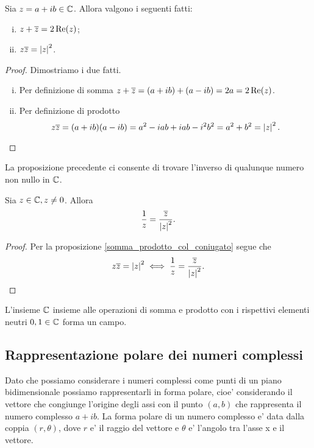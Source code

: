 \begin{proposition}\label{somma_prodotto_col_coniugato}
    Sia $z = a+ib \in \mathbb{C}$. Allora valgono i seguenti fatti:
    \begin{enumerate}[(i)]
        \item $z + \overline{z} = 2\operatorname{Re}(z)$;
        \item $z\overline{z} = \left|z\right|^2$.
    \end{enumerate}
\end{proposition}
\begin{proof}
    Dimostriamo i due fatti.
    \begin{enumerate}[(i)]
        \item Per definizione di somma $z + \overline{z} = (a + ib) + (a - ib) = 2a = 2\operatorname{Re}(z)$.
        \item Per definizione di prodotto \[
            z\overline{z} = (a + ib)(a - ib) = a^2 - iab + iab - i^2b^2 = a^2 + b^2 = \left|z\right|^2.\qedhere
        \] 
    \end{enumerate}
\end{proof}

La proposizione precedente ci consente di trovare l'inverso di qualunque numero non nullo in $\mathbb{C}$.

\begin{proposition}
    Sia $z \in \mathbb{C}, z \neq 0$. Allora \[\frac{1}{z} = \frac{\overline{z}}{\left|z\right|^2}.\]
\end{proposition}
\begin{proof}
    Per la proposizione \ref{somma_prodotto_col_coniugato} segue che \[
        z\overline{z} = \left|z\right|^2 \iff \frac{1}{z} = \frac{\overline{z}}{\left|z\right|^2}. \qedhere   
    \]
\end{proof}

\begin{proposition}
    L'insieme $\mathbb{C}$ insieme alle operazioni di somma e prodotto con i rispettivi elementi neutri $0, 1 \in \mathbb{C}$ forma un campo.
\end{proposition}

\subsection{Rappresentazione polare dei numeri complessi}

Dato che possiamo considerare i numeri complessi come punti di un piano bidimensionale possiamo rappresentarli in forma polare, cioe' considerando il vettore che congiunge l'origine degli assi con il punto $(a, b)$ che rappresenta il numero complesso $a + ib$. La forma polare di un numero complesso e' data dalla coppia $(r, \theta)$, dove $r$ e' il raggio del vettore e $\theta$ e' l'angolo tra l'asse x e il vettore.

